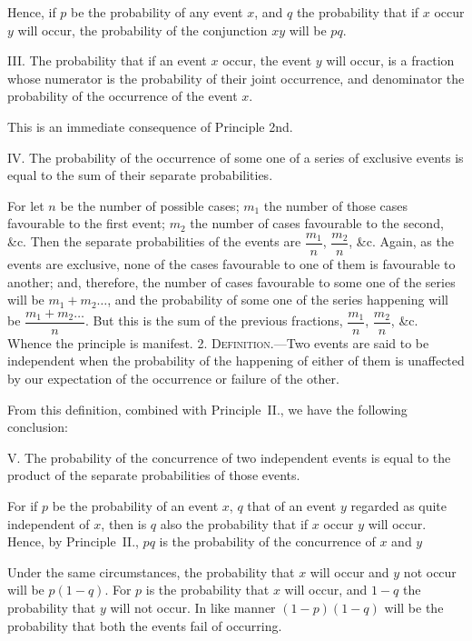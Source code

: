 \documentclass[oneside]{book}
\begin{document}
Hence, if $p$ be the probability of any event $x$, and $q$ the probability
that if $x$ occur $y$ will occur, the probability of the conjunction $xy$ will be $pq$.

III. The probability that if an event $x$ occur, the event $y$ will
occur, is a fraction whose numerator is the probability of their
joint occurrence, and denominator the probability of the occurrence of the event $x$.

This is an immediate consequence of Principle 2nd.

IV. The probability of the occurrence of some one of a series
of exclusive events is equal to the sum of their separate probabilities.

For let $n$ be the number of possible cases; $m_1$ the number of
those cases favourable to the first event; $m_2$ the number of cases
favourable to the second, \&c. Then the separate probabilities of
the events are $\dfrac{m_1}{n}$, $\dfrac{m_2}{n}$, \&c. Again, as the events are exclusive,
none of the cases favourable to one of them is favourable to
another; and, therefore, the number of cases favourable to some
one of the series will be $m_1 + m_2 \dotsc$, and the probability of some
one of the series happening will be
$\dfrac{m_1 + m_2 \dotsc}{n}$. But this is the
sum of the previous fractions, $\dfrac{m_1}{n}$, $\dfrac{m_2}{n}$, \&c. Whence
the principle is manifest.
2. \textsc{Definition.}---Two events are said to be independent
when the probability of the happening of either of them is
unaffected by our expectation of the occurrence or failure of
the other.

From this definition, combined with Principle~II., we have
the following conclusion:

V. The probability of the concurrence of two independent
events is equal to the product of the separate probabilities of
those events.

For if $p$ be the probability of an event $x$, $q$ that of an event $y$
regarded as quite independent of $x$, then is $q$ also the probability
that if $x$ occur $y$ will occur. Hence, by Principle~II., $pq$ is the
probability of the concurrence of $x$ and $y$

Under the same circumstances, the probability that $x$ will
occur and $y$ not occur will be $p(1-q)$. For $p$ is the probability
that $x$ will occur, and $1-q$ the probability that $y$ will not occur.
In like manner $(1-p)(1-q)$ will be the probability that both
the events fail of occurring.
\end{document}
